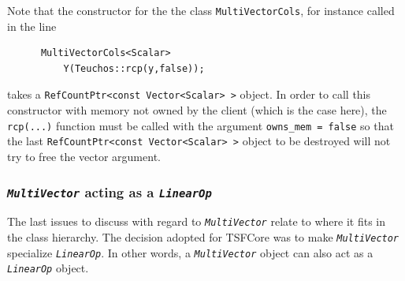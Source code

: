 \noindent Note that the constructor for the the class \texttt{MultiVectorCols},
for instance called in the line

{\scriptsize\begin{verbatim}
      MultiVectorCols<Scalar>
          Y(Teuchos::rcp(y,false));
\end{verbatim}}

\noindent takes a \texttt{RefCountPtr<const Vector<Scalar> >} object.  In
order to call this constructor with memory not owned by the client
(which is the case here), the \texttt{rcp(...)} function must be
called with the argument \texttt{owns\_mem = false} so that the last
\texttt{RefCountPtr<const Vector<Scalar> >} object to be destroyed
will not try to free the vector argument.

%
\subsubsection{\texttt{\textit{Multi\-Vector}} acting as a \texttt{\textit{LinearOp}}}
\label{tsfcore:sec:multi_vec_linear_op}
%

The last issues to discuss with regard to
\texttt{\textit{Multi\-Vector}} relate to where it fits in the class
hierarchy.  The decision adopted for TSFCore was to make
\texttt{\textit{Multi\-Vector}} specialize \texttt{\textit{LinearOp}}.
In other words, a \texttt{\textit{Multi\-Vector}} object can also act as
a \texttt{\textit{LinearOp}} object.

